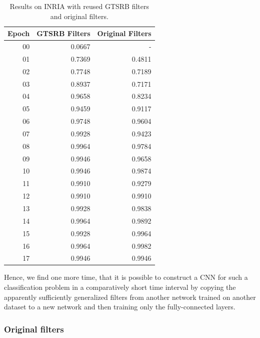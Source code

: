 \documentclass[11pt, a4paper]{article}
\begin{document}
\begin{table}[h!]
	\centering
	\begin{tabular}{|r|rr|}
		\hline
		Epoch & GTSRB Filters & Original Filters\\ \hline
		00 & 0.0667 & -\\
		01 & 0.7369 & 0.4811\\
		02 & 0.7748 & 0.7189\\
		03 & 0.8937 & 0.7171\\
		04 & 0.9658 & 0.8234\\
		05 & 0.9459 & 0.9117\\
		06 & 0.9748 & 0.9604\\
		07 & 0.9928 & 0.9423\\
		08 & 0.9964 & 0.9784\\
		09 & 0.9946 & 0.9658\\
		10 & 0.9946 & 0.9874\\
		11 & 0.9910 & 0.9279\\
		12 & 0.9910 & 0.9910\\
		13 & 0.9928 & 0.9838\\
		14 & 0.9964 & 0.9892\\
		15 & 0.9928 & 0.9964\\
		16 & 0.9964 & 0.9982\\
		17 & 0.9946 & 0.9946\\ \hline
	\end{tabular}

	\caption{Results on INRIA with reused GTSRB filters and original filters. }
	\label{tab:inria-results}
\end{table}

Hence, we find one more time, that it is possible to construct a CNN for such a classification problem in a comparatively short time interval by copying the apparently sufficiently generalized filters from another network trained on another dataset to a new network and then training only the fully-connected layers.

\subsubsection{Original filters}
\end{document}
